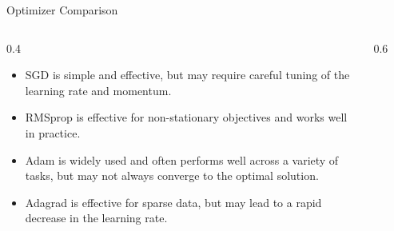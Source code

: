 \begin{frame}{}{Optimizer Comparison}
    \begin{columns}
        \begin{column}{0.4\textwidth}
            \begin{itemize}
                \item SGD is simple and effective, but may require careful tuning of the learning rate and momentum.
                \item RMSprop is effective for non-stationary objectives and works well in practice.
                \item Adam is widely used and often performs well across a variety of tasks, but may not always converge to the optimal solution.
                \item Adagrad is effective for sparse data, but may lead to a rapid decrease in the learning rate.
            \end{itemize}
        \end{column}
        \begin{column}{0.6\textwidth}
            \begin{figure}
            \end{figure}
        \end{column}
    \end{columns}
\end{frame}







